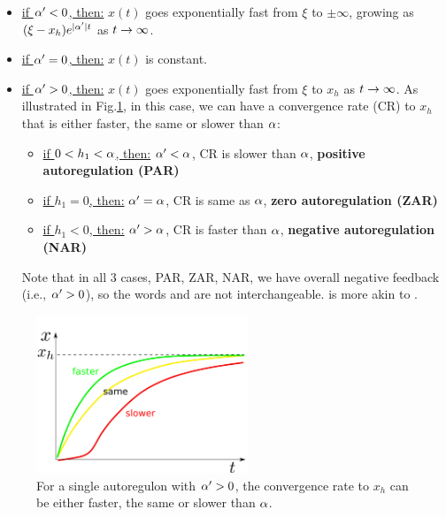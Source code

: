 \begin{itemize}
\item
\ul{if $\alpha'<0$, then:} $x(t)$ 
goes exponentially fast  from $\xi $ to $\pm \infty$,
growing as  $(\xi  -x_h)e^{|\alpha'|t}$
as $t\rightarrow \infty$. 

\item \ul{if $\alpha'=0$, then:}
$x(t)$ is constant. 

\item 
\ul{if $\alpha'>0$, then:} $x(t)$ goes exponentially fast from
$\xi $ to $x_h$ as $t\rightarrow \infty$.
As illustrated in Fig.\ref{fig-fast-normal-slow}, in
this case,
we can have a convergence rate (CR)
 to $x_h$
 that is either faster, the same or slower than $\alpha$:
\begin{itemize}[$\checkmark$]

\item \ul{if $0<h_1<\alpha$, then:} $\alpha'<\alpha$, 
CR is slower than $\alpha$, {\bf positive autoregulation (PAR)}

\item \ul{if $h_1=0$, then:} $\alpha'=\alpha$, CR is same as $\alpha$,
{\bf zero autoregulation (ZAR)}

\item \ul{if $h_1<0$, then:} $\alpha'>\alpha$, CR is faster than $\alpha$,
{\bf negative autoregulation (NAR)}
\end{itemize}
Note that in all 3 cases, PAR, ZAR, NAR, we have 
overall negative feedback
(i.e., $\alpha'>0$), so 
the words 
and  are not
interchangeable. 
is more akin to .

\end{itemize}


\begin{figure}[h!]
\centering
\includegraphics[width=2.5in]
{autoregulons/fast-normal-slow.png}
\caption{For a single autoregulon
with $\alpha'>0$, the convergence rate to $x_h$ can 
be either faster, the same or slower than $\alpha$.
 }
\label{fig-fast-normal-slow}
\end{figure}




